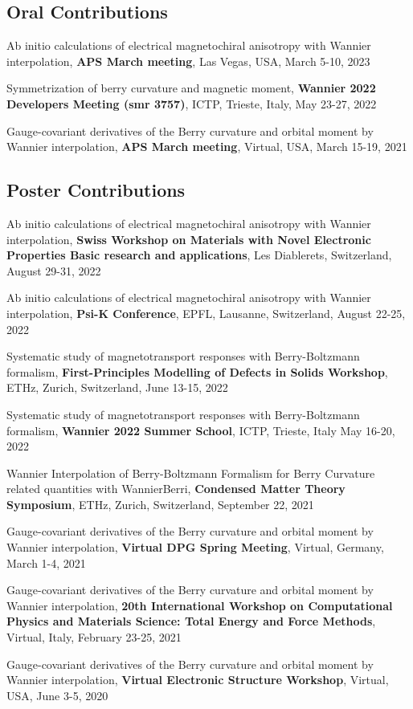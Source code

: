 \documentclass[11pt,a4paper,sans]{moderncv} %
\begin{document}
\subsection{Oral Contributions}
\begin{etaremune}
  \item Ab initio calculations of electrical magnetochiral anisotropy with Wannier interpolation, \textbf{APS March meeting}, Las Vegas, USA, March 5-10, 2023
  \item Symmetrization of berry curvature and magnetic moment, \textbf{Wannier 2022 Developers Meeting (smr 3757)}, ICTP, Trieste, Italy, May 23-27, 2022
  \item Gauge-covariant derivatives of the Berry curvature and orbital moment by Wannier interpolation, \textbf{APS March meeting}, Virtual, USA, March 15-19, 2021
\end{etaremune}

\subsection{Poster Contributions}
\begin{etaremune}
  \item Ab initio calculations of electrical magnetochiral anisotropy with Wannier interpolation, \textbf{Swiss Workshop on Materials with Novel Electronic Properties Basic research and applications}, Les Diablerets, Switzerland, August 29-31, 2022
  \item Ab initio calculations of electrical magnetochiral anisotropy with Wannier interpolation, \textbf{Psi-K Conference}, EPFL, Lausanne, Switzerland, August 22-25, 2022
  \item Systematic study of magnetotransport responses with Berry-Boltzmann formalism, \textbf{First-Principles Modelling of Defects in Solids Workshop}, ETHz, Zurich, Switzerland, June 13-15, 2022
  \item Systematic study of magnetotransport responses with Berry-Boltzmann formalism, \textbf{Wannier 2022 Summer School}, ICTP, Trieste, Italy May 16-20, 2022
  \item Wannier Interpolation of Berry-Boltzmann Formalism for Berry Curvature related quantities with WannierBerri, \textbf{Condensed Matter Theory Symposium}, ETHz, Zurich, Switzerland, September 22, 2021
  \item Gauge-covariant derivatives of the Berry curvature and orbital moment by Wannier interpolation, \textbf{Virtual DPG Spring Meeting}, Virtual, Germany, March 1-4, 2021
  \item Gauge-covariant derivatives of the Berry curvature and orbital moment by Wannier interpolation, \textbf{20th International Workshop on Computational Physics and Materials Science: Total Energy and Force Methods}, Virtual, Italy, February 23-25, 2021
  \item Gauge-covariant derivatives of the Berry curvature and orbital moment by Wannier interpolation, \textbf{Virtual Electronic Structure Workshop}, Virtual, USA, June 3-5, 2020
\end{etaremune}
\end{document}
